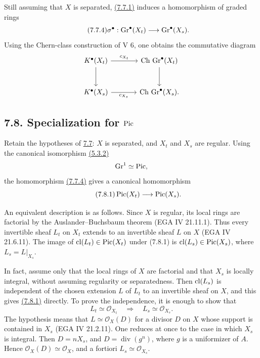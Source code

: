Still assuming that $X$ is separated, \hyperlink{sga6.e10.eq.7-7-1}{(7.7.1)} induces a homomorphism of
graded rings
\begin{equation}\tag{7.7.4}
\sigma^\bullet:\operatorname{Gr}^\bullet(X_t)\longrightarrow\operatorname{Gr}^\bullet(X_s).
\end{equation}
Using the Chern-class construction of V 6, one obtains the commutative
diagram
\[
\begin{tikzcd}[column sep=large,row sep=large]
K^\bullet(X_t) \arrow[r,"c_{X_t}"] \arrow[d] &
\Ch\,\Gr^\bullet(X_t) \arrow[d]\\
K^\bullet(X_s) \arrow[r,"c_{X_s}"'] &
\Ch\,\Gr^\bullet(X_s).
\end{tikzcd}
\]

\subsection*{7.8. Specialization for $\operatorname{Pic}$}
Retain the hypotheses of \hyperlink{sga6.e10.sec.7.7}{7.7}: $X$ is separated, and $X_t$ and $X_s$ are
regular. Using the canonical isomorphism \hyperlink{sga6.e10.thm.5-3-2}{(5.3.2)}
\[
\operatorname{Gr}^1\simeq\operatorname{Pic},
\]
the homomorphism \hyperlink{sga6.e10.eq.7-7-4}{(7.7.4)} gives a canonical homomorphism
\begin{equation}\tag{7.8.1}
\operatorname{Pic}(X_t)\longrightarrow\operatorname{Pic}(X_s).
\end{equation}

An equivalent description is as follows. Since $X$ is regular, its local
rings are factorial by the Auslander--Buchsbaum theorem (EGA IV 21.11.1).
Thus every invertible sheaf $L_t$ on $X_t$ extends to an invertible sheaf
$L$ on $X$ (EGA IV 21.6.11). The image of
$\operatorname{cl}(L_t)\in\operatorname{Pic}(X_t)$ under (7.8.1) is
$\operatorname{cl}(L_s)\in\operatorname{Pic}(X_s)$, where $L_s=L|_{X_s}$.

In fact, assume only that the local rings of $X$ are factorial and that
$X_s$ is locally integral, without assuming regularity or separatedness.
Then $\operatorname{cl}(L_s)$ is independent of the chosen extension $L$ of $L_t$ to an
invertible sheaf on $X$, and this gives \hyperlink{sga6.e10.eq.7-8-1}{(7.8.1)} directly. To prove the
independence, it is enough to show that
\[
L_t\simeq\mathcal O_{X_t}\quad\Longrightarrow\quad
L_s\simeq\mathcal O_{X_s}.
\]
The hypothesis means that $L\simeq\mathcal O_X(D)$ for a divisor $D$ on
$X$ whose support is contained in $X_s$ (EGA IV 21.2.11). One reduces at
once to the case in which $X_s$ is integral. Then $D=nX_s$, and
$D=\operatorname{div}(g^n)$, where $g$ is a uniformizer of $A$. Hence
$\mathcal O_X(D)\simeq\mathcal O_X$, and a fortiori
$L_s\simeq\mathcal O_{X_s}$.

